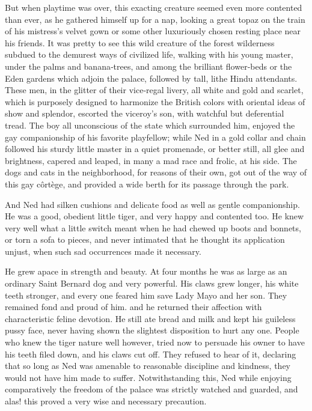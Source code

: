 \documentclass[12pt]{book}
\begin{document}
But when playtime was over, this exacting creature seemed even more contented than ever, as he gathered himself up for a nap, looking a great topaz on the
train of his mistress’s velvet gown or some other luxuriously chosen resting place
near his friends. It was pretty to see this wild creature of the forest wilderness
subdued to the demurest ways of civilized life, walking with his young master,
under the palms and banana‐trees, and among the brilliant flower‐beds or the
Eden gardens which adjoin the palace, followed by tall, lithe Hindu attendants.
These men, in the glitter of their vice‐regal livery, all white and gold and scarlet,
which is purposely designed to harmonize the British colors with oriental ideas
of show and splendor, escorted the viceroy’s son, with watchful but deferential
tread. The boy all unconscious of the state which surrounded him, enjoyed the
gay companionship of his favorite playfellow; while Ned in a gold collar and
chain followed his sturdy little master in a quiet promenade, or better still, all
glee and brightness, capered and leaped, in many a mad race and frolic, at his
side. The dogs and cats in the neighborhood, for reasons of their own, got out of
the way of this gay côrtège, and provided a wide berth for its passage through
the park.

And Ned had silken cushions and delicate food as well as gentle companionship. He was a good, obedient little tiger, and very happy and contented too.
He knew very well what a little switch meant when he had chewed up boots
and bonnets, or torn a sofa to pieces, and never intimated that he thought its
application unjust, when such sad occurrences made it necessary.

He grew apace in strength and beauty. At four months he was as large as
an ordinary Saint Bernard dog and very powerful. His claws grew longer, his
white teeth stronger, and every one feared him save Lady Mayo and her son.
They remained fond and proud of him. and he returned their affection with
characteristic feline devotion. He still ate bread and milk and kept his guileless
pussy face, never having shown the slightest disposition to hurt any one. People
who knew the tiger nature well however, tried now to persuade his owner to have
his teeth filed down, and his claws cut off. They refused to hear of it, declaring
that so long as Ned was amenable to reasonable discipline and kindness, they
would not have him made to suffer. Notwithstanding this, Ned while enjoying
comparatively the freedom of the palace was strictly watched and guarded, and
alas! this proved a very wise and necessary precaution.
\end{document}
